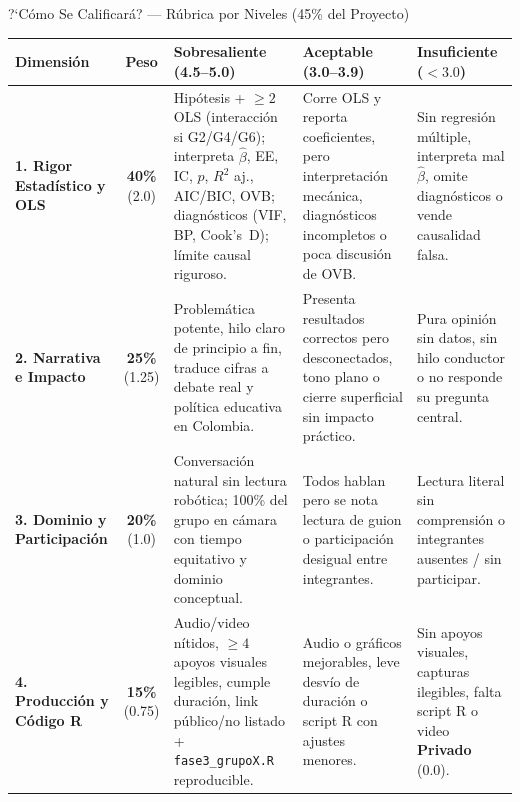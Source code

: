 \documentclass[aspectratio=169, 10pt]{beamer}
\begin{document}
\begin{frame}{?`C\'omo Se Calificar\'a? --- R\'ubrica por Niveles (45\% del Proyecto)}
  \renewcommand{\arraystretch}{1.18}
  \setlength{\tabcolsep}{3.5pt}
  \begin{center}
  \scriptsize
  \begin{tabular}{>{\raggedright\arraybackslash}p{2.1cm} c >{\raggedright\arraybackslash}p{3.45cm} >{\raggedright\arraybackslash}p{3.1cm} >{\raggedright\arraybackslash}p{2.6cm}}
    \toprule
    \textbf{Dimensi\'on} & \textbf{Peso} & \textbf{Sobresaliente (4.5--5.0)} & \textbf{Aceptable (3.0--3.9)} & \textbf{Insuficiente ($< 3.0$)} \\
    \midrule
    \textbf{1. Rigor Estad\'istico y OLS} & \textbf{40\%} (2.0) &
      Hip\'otesis + $\ge 2$ OLS (interacci\'on si G2/G4/G6); interpreta $\hat{\beta}$, EE, IC, $p$, $R^2$ aj., AIC/BIC, OVB; diagn\'osticos (VIF, BP, Cook's~D); l\'imite causal riguroso. &
      Corre OLS y reporta coeficientes, pero interpretaci\'on mec\'anica, diagn\'osticos incompletos o poca discusi\'on de OVB. &
      Sin regresi\'on m\'ultiple, interpreta mal $\hat{\beta}$, omite diagn\'osticos o vende causalidad falsa. \\[4pt]
    \textbf{2. Narrativa e Impacto} & \textbf{25\%} (1.25) &
      Problem\'atica potente, hilo claro de principio a fin, traduce cifras a debate real y pol\'itica educativa en Colombia. &
      Presenta resultados correctos pero desconectados, tono plano o cierre superficial sin impacto pr\'actico. &
      Pura opini\'on sin datos, sin hilo conductor o no responde su pregunta central. \\[4pt]
    \textbf{3. Dominio y Participaci\'on} & \textbf{20\%} (1.0) &
      Conversaci\'on natural sin lectura rob\'otica; 100\% del grupo en c\'amara con tiempo equitativo y dominio conceptual. &
      Todos hablan pero se nota lectura de guion o participaci\'on desigual entre integrantes. &
      Lectura literal sin comprensi\'on o integrantes ausentes / sin participar. \\[4pt]
    \textbf{4. Producci\'on y C\'odigo R} & \textbf{15\%} (0.75) &
      Audio/video n\'itidos, $\ge 4$ apoyos visuales legibles, cumple duraci\'on, link p\'ublico/no listado + \texttt{fase3\_grupoX.R} reproducible. &
      Audio o gr\'aficos mejorables, leve desv\'io de duraci\'on o script R con ajustes menores. &
      Sin apoyos visuales, capturas ilegibles, falta script R o video \textbf{Privado} (0.0). \\
    \bottomrule
  \end{tabular}
  \end{center}
  \renewcommand{\arraystretch}{1.0}
\end{frame}
\end{document}
